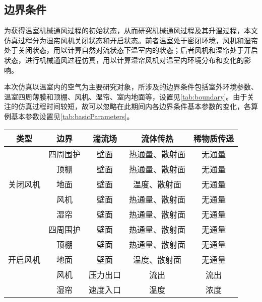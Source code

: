 	\subsection{边界条件}
	为获得温室机械通风过程的初始状态，从而研究机械通风过程及其升温过程，本文仿真过程分为湿帘风机关闭状态和开启状态。前者温室处于密闭环境，风机和湿帘处于关闭状态，用以计算自然对流状态下温室内的状态；后者风机和湿帘处于开启状态，进行机械通风过程仿真，用以计算湿帘风机对温室内环境分布和变化的影响。
	
本次仿真以温室内的空气为主要研究对象，所涉及的边界条件包括室外环境参数、温室四周薄膜和顶棚、风机、湿帘、室内地面等，设置见\ref{tab:boundary}。由于关注的仿真过程时间较短，故可以忽略在此期间内各边界条件基本参数的变化，各算例基本参数设置见\ref{tab:basicParameters}。
		\begin{table}[!htbp]
  			\centering
  			\begin{tabular}{ccccc} \toprule
			类型	 & 边界 & 湍流场 & 	流体传热 & 	稀物质传递\\ \midrule
			\multirow{5}{*}{关闭风机} & 四周围护 & 壁面 & 热通量、散射面 & 无通量\\ 
												  & 顶棚  & 壁面 & 热通量、散射面 & 无通量\\
												  & 地面 & 壁面 & 温度、散射面 & 无通量\\
												  & 风机 & 壁面 & 热通量、散射面 & 无通量\\
												  & 湿帘 & 壁面 & 热通量、散射面 & 无通量\\ \midrule
			\multirow{5}{*}{开启风机} & 四周围护 & 壁面 & 热通量、散射面 & 无通量\\
												  & 顶棚 & 壁面	 & 热通量、散射面	 & 无通量\\
												  & 地面 &  壁面 & 温度、散射面	 & 无通量\\
												  & 风机 &  压力出口 & 	流出 & 	流出\\
												  & 湿帘 & 速度入口	 & 温度 & 浓度\\ \bottomrule
 			\end{tabular}
		\end{table}	
